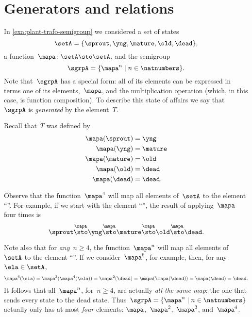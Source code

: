 

\section{Generators and relations}


In \cref{exa:plant-trafo-semigroup} we considered a set of states
%
\begin{equation}
    \setA= \{ \sprout, \yng, \mature, \old, \dead \},
\end{equation}
%
a function~$\mapa \colon \setA \sto \setA$, and the semigroup
%
\begin{equation}
    \label{eq:trafo-sgrp-one-gen}
    \sgrpA = \{ \mapa^n \mid n \in \natnumbers \}.
\end{equation}
%
Note that~$\sgrpA$ has a special form: all of its elements can be expressed in terms one of its elements,~$\mapa$, and the multiplication operation (which, in this case, is function composition).
To describe this state of affairs we say that~$\sgrpA$ is \emph{generated} by the element~$T$.


Recall that~$T$ was defined by
%
\begin{align*}
    \mapa(\sprout) &=  \yng \\
    \mapa(\yng) &=  \mature \\
    \mapa(\mature) &=  \old \\
    \mapa( \old) &= \dead \\
    \mapa(\dead) &= \dead.
\end{align*}

Observe that the function~$\mapa^4$ will map all elements of~$\setA$ to the element ``\dead''.
For example, if we start with the element ``\sprout'', the result of applying~$\mapa$ four times is
%
\begin{equation*}
    \sprout \overset{\mapa}{\sto} \yng \overset{\mapa}{\sto} \mature \overset{\mapa}{\sto} \old \overset{\mapa}{\sto} \dead.
\end{equation*}

Note also that for \emph{any}~$n \geq 4$, the function~$\mapa^n$ will map all elements of~$\setA$ to the element ``\dead''.
If we consider~$\mapa^6$, for example, then, for any~$\ela \in \setA$,
%
\begin{equation*}
    \mapa^6(\ela) = \mapa^2(\mapa^4(\ela)) = \mapa^2(\dead) = \mapa(\mapa(\dead)) = \mapa(\dead) = \dead.
\end{equation*}
%
It follows that all~$\mapa^n$, for~$n \geq 4$, are actually \emph{all the same map}: the one that sends every state to the dead state.
Thus~$\sgrpA = \{ \mapa^n \mid n \in \natnumbers \}$ actually only has at most \emph{four} elements: $\mapa$,~$\mapa^2$,~$\mapa^3$, and~$\mapa^4$.

